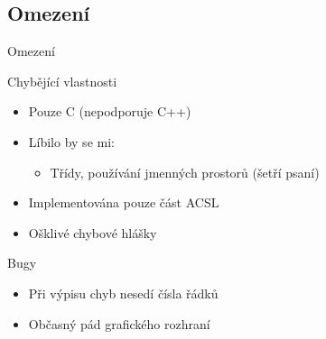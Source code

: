 \documentclass[11pt]{beamer}
\begin{document}
\subsection{Omezení}

\begin{frame}{Omezení}
\end{frame}

\begin{frame}{Chybějící vlastnosti}
	\begin{itemize}
		\item Pouze C (nepodporuje C++)
		\item Líbilo by se mi:
			\begin{itemize}
				\item Třídy, používání jmenných prostorů (šetří psaní)
			\end{itemize}
		\item Implementována pouze část ACSL
		\item Ošklivé chybové hlášky
	\end{itemize}
\end{frame}


\begin{frame}{Bugy}
	\begin{itemize}
		\item Při výpisu chyb nesedí čísla řádků
		\item Občasný pád grafického rozhraní
	\end{itemize}
\end{frame}
\end{document}
